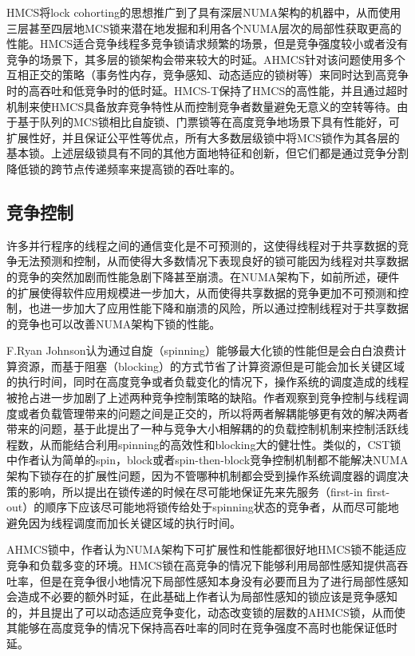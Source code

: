 HMCS将lock cohorting的思想推广到了具有深层NUMA架构的机器中，从而使用三层甚至四层地MCS锁来潜在地发掘和利用各个NUMA层次的局部性获取更高的性能。HMCS适合竞争线程多竞争锁请求频繁的场景，但是竞争强度较小或者没有竞争的场景下，其多层的锁架构会带来较大的时延。AHMCS针对该问题使用多个互相正交的策略（事务性内存，竞争感知、动态适应的锁树等）来同时达到高竞争时的高吞吐和低竞争时的低时延。HMCS-T保持了HMCS的高性能，并且通过超时机制来使HMCS具备放弃竞争特性从而控制竞争者数量避免无意义的空转等待。由于基于队列的MCS锁相比自旋锁、门票锁等在高度竞争地场景下具有性能好，可扩展性好，并且保证公平性等优点，所有大多数层级锁中将MCS锁作为其各层的基本锁。上述层级锁具有不同的其他方面地特征和创新，但它们都是通过竞争分割降低锁的跨节点传递频率来提高锁的吞吐率的。

\subsection{竞争控制}
许多并行程序的线程之间的通信变化是不可预测的，这使得线程对于共享数据的竞争无法预测和控制，从而使得大多数情况下表现良好的锁可能因为线程对共享数据的竞争的突然加剧而性能急剧下降甚至崩溃\cite{johnson2010decoupling}\cite{boyd2012non}。在NUMA架构下，如前所述，硬件的扩展使得软件应用规模进一步加大，从而使得共享数据的竞争更加不可预测和控制，也进一步加大了应用性能下降和崩溃的风险，所以通过控制线程对于共享数据的竞争也可以改善NUMA架构下锁的性能。

F.Ryan Johnson\cite{johnson2010decoupling}认为通过自旋（spinning）能够最大化锁的性能但是会白白浪费计算资源，而基于阻塞（blocking）的方式节省了计算资源但是可能会加长关键区域的执行时间，同时在高度竞争或者负载变化的情况下，操作系统的调度造成的线程被抢占进一步加剧了上述两种竞争控制策略的缺陷。作者观察到竞争控制与线程调度或者负载管理带来的问题之间是正交的，所以将两者解耦能够更有效的解决两者带来的问题，基于此提出了一种与竞争大小相解耦的的负载控制机制来控制活跃线程数，从而能结合利用spinning的高效性和blocking大的健壮性。类似的，CST锁\cite{kashyap2017scalable}中作者认为简单的spin，block或者spin-then-block竞争控制机制都不能解决NUMA架构下锁存在的扩展性问题，因为不管哪种机制都会受到操作系统调度器的调度决策的影响，所以提出在锁传递的时候在尽可能地保证先来先服务（first-in first-out）的顺序下应该尽可能地将锁传给处于spinning状态的竞争者，从而尽可能地避免因为线程调度而加长关键区域的执行时间。

AHMCS\cite{chabbi2016contention}锁中，作者认为NUMA架构下可扩展性和性能都很好地HMCS\cite{chabbi2015high}锁不能适应竞争和负载多变的环境。HMCS锁在高竞争的情况下能够利用局部性感知提供高吞吐率，但是在竞争很小地情况下局部性感知本身没有必要而且为了进行局部性感知会造成不必要的额外时延，在此基础上作者认为局部性感知的锁应该是竞争感知的，并且提出了可以动态适应竞争变化，动态改变锁的层数的AHMCS锁，从而使其能够在高度竞争的情况下保持高吞吐率的同时在竞争强度不高时也能保证低时延。

